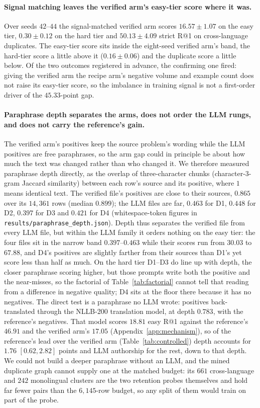 \paragraph{Signal matching leaves the verified arm's easy-tier score where it was.}Over seeds $42$--$44$ the signal-matched verified arm scores $16.57 \pm 1.07$ on the easy tier, $0.30 \pm 0.12$ on the hard tier and $50.13 \pm 4.09$ strict R@1 on cross-language duplicates. The easy-tier score sits inside the eight-seed verified arm's band, the hard-tier score a little above it ($0.16 \pm 0.06$) and the duplicate score a little below. Of the two outcomes registered in advance, the confirming one fired: giving the verified arm the recipe arm's negative volume and example count does not raise its easy-tier score, so the imbalance in training signal is not a first-order driver of the $45.33$-point gap.

\paragraph{Paraphrase depth separates the arms, does not order the LLM rungs, and does not carry the reference's gain.}
The verified arm's positives keep the source problem's wording while the LLM positives are free paraphrases, so the arm gap could in principle be about how much the text was changed rather than who changed it. We therefore measured paraphrase depth directly, as the overlap of three-character chunks (character-$3$-gram Jaccard similarity) between each row's source and its positive, where $1$ means identical text. The verified file's positives are close to their sources, $0.865$ over its $14{,}361$ rows (median $0.899$); the LLM files are far, $0.463$ for D1, $0.448$ for D2, $0.397$ for D3 and $0.421$ for D4 (whitespace-token figures in \texttt{results/paraphrase\_depth.json}). Depth thus separates the verified file from every LLM file, but within the LLM family it orders nothing on the easy tier: the four files sit in the narrow band $0.397$--$0.463$ while their scores run from $30.03$ to $67.88$, and D4's positives are slightly farther from their sources than D1's yet score less than half as much. On the hard tier D1--D3 do line up with depth, the closer paraphrase scoring higher, but those prompts write both the positive and the near-misses, so the factorial of Table~\ref{tab:factorial} cannot tell that reading from a difference in negative quality; D4 sits at the floor there because it has no negatives. The direct test is a paraphrase no LLM wrote: positives back-translated through the NLLB-200 translation model, at depth $0.783$, with the reference's negatives. That model scores $18.81$ easy R@1 against the reference's $46.91$ and the verified arm's $17.05$ (Appendix~\ref{app:mechanism}), so of the reference's lead over the verified arm (Table~\ref{tab:controlled}) depth accounts for $1.76$ $[0.62, 2.82]$ points and LLM authorship for the rest, down to that depth. We could not build a deeper paraphrase without an LLM, and the mined duplicate graph cannot supply one at the matched budget: its $661$ cross-language and $242$ monolingual clusters are the two retention probes themselves and hold far fewer pairs than the $6{,}145$-row budget, so any split of them would train on part of the probe.

